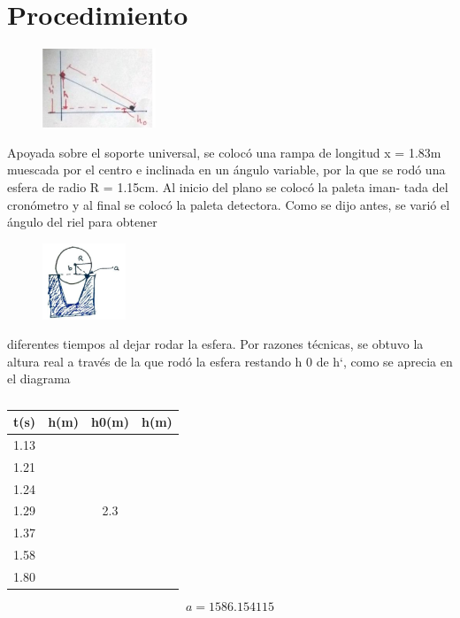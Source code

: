 \section{Procedimiento}
\begin{minipage}{0.2\linewidth}
    \begin{figure}[H]
        \includegraphics[scale=0.8]{Images/ima2.png}
        \caption{}
        \label{fig:ima2}
    \end{figure}
\end{minipage}
\begin{minipage}{0.6\linewidth}
    Apoyada sobre el soporte universal, se colocó una rampa de
longitud x = 1.83m muescada por el centro e inclinada en
un ángulo variable, por la que se rodó una esfera de radio
R = 1.15cm. Al inicio del plano se colocó la paleta iman-
tada del cronómetro y al final se colocó la paleta detectora.
Como se dijo antes, se varió el ángulo del riel para obtener
\end{minipage}
\begin{minipage}{0.2\linewidth}
    \begin{figure}[H]
        \includegraphics[scale=1]{Images/ima3.png}
        \caption{}
        \label{fig:ima3}
    \end{figure}
\end{minipage}
diferentes tiempos al dejar rodar la esfera. Por razones técnicas, se obtuvo la altura real a través de la que
rodó la esfera restando h 0 de h‘, como se aprecia en el diagrama\\
\begin{minipage}{0.4\linewidth}
    \begin{table}[H]
        \begin{tabular}{|c|c|c|c|} \hline
            t(s) & h(m)& h0(m)& h(m) \\ \hline
1.13& & &\\ \hline
1.21& & &\\ \hline
1.24& & &\\ \hline
1.29& &2.3 &\\ \hline
1.37& & &\\ \hline
1.58& & &\\ \hline
1.80& & &\\ \hline
        \end{tabular}
        \caption{}
    \end{table}
    \begin{equation*}
        a=1586.154115
    \end{equation*}
\end{minipage}